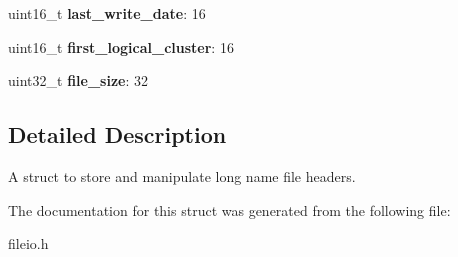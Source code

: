 \begin{DoxyCompactItemize}
\item 
\hypertarget{struct_f_i_l_e___h_e_a_d_e_r___r_e_g_a6b4fa9ab78ff9d82a86f3dc0ce46f386}{}uint16\+\_\+t {\bfseries last\+\_\+write\+\_\+date}\+: 16\label{struct_f_i_l_e___h_e_a_d_e_r___r_e_g_a6b4fa9ab78ff9d82a86f3dc0ce46f386}

\item 
\hypertarget{struct_f_i_l_e___h_e_a_d_e_r___r_e_g_a647b9ca24ece9af97dd6945fffa08823}{}uint16\+\_\+t {\bfseries first\+\_\+logical\+\_\+cluster}\+: 16\label{struct_f_i_l_e___h_e_a_d_e_r___r_e_g_a647b9ca24ece9af97dd6945fffa08823}

\item 
\hypertarget{struct_f_i_l_e___h_e_a_d_e_r___r_e_g_a15a201e1ebf27c6b3feb34688bd76330}{}uint32\+\_\+t {\bfseries file\+\_\+size}\+: 32\label{struct_f_i_l_e___h_e_a_d_e_r___r_e_g_a15a201e1ebf27c6b3feb34688bd76330}

\end{DoxyCompactItemize}


\subsection{Detailed Description}
A struct to store and manipulate long name file headers. 

The documentation for this struct was generated from the following file\+:\begin{DoxyCompactItemize}
\item 
fileio.\+h\end{DoxyCompactItemize}
